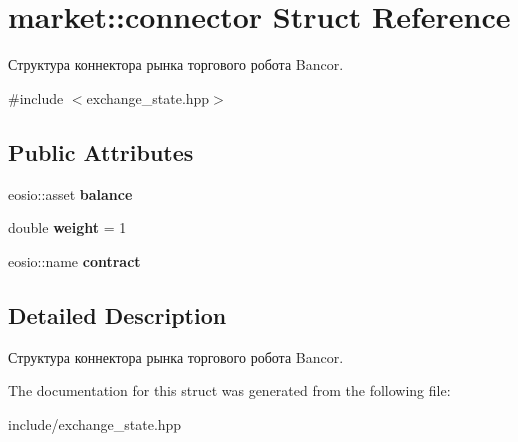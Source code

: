\hypertarget{structmarket_1_1connector}{}\section{market\+:\+:connector Struct Reference}
\label{structmarket_1_1connector}


Структура коннектора рынка торгового робота Bancor.  




{\ttfamily \#include $<$exchange\+\_\+state.\+hpp$>$}

\subsection*{Public Attributes}
\begin{DoxyCompactItemize}
\item 
\mbox{\label{structmarket_1_1connector_ad219384bf98be14060d3ffc95368a0d9}} 
eosio\+::asset {\bfseries balance}
\item 
\mbox{\label{structmarket_1_1connector_a8c91ee071e79b355dbdcaa47e57c94e4}} 
double {\bfseries weight} = 1
\item 
\mbox{\label{structmarket_1_1connector_a07c202c4ae0204d5b71ddccdf4dc9169}} 
eosio\+::name {\bfseries contract}
\end{DoxyCompactItemize}


\subsection{Detailed Description}
Структура коннектора рынка торгового робота Bancor. 

The documentation for this struct was generated from the following file\+:\begin{DoxyCompactItemize}
\item 
include/exchange\+\_\+state.\+hpp\end{DoxyCompactItemize}
